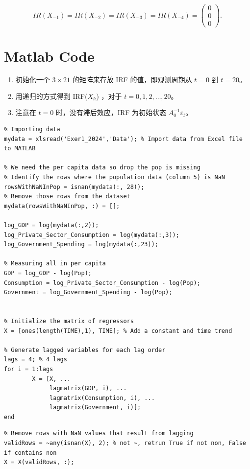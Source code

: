 \documentclass{article}
\begin{document}
\begin{CJK}{UTF8}{gbsn}
\begin{equation}
    IR(X_{-1}) = IR(X_{-2}) = IR(X_{-3}) = IR(X_{-4}) = \begin{pmatrix} 0 \\ 0 \\ 0 \end{pmatrix}.
\end{equation}

\section*{Matlab Code}
\begin{enumerate}
    \item 初始化一个 $3 \times 21$ 的矩阵来存放 IRF 的值，即观测周期从 $t = 0$ 到 $t = 20$。
    \item 用递归的方式得到 IRF($X_h$) ，对于 $t = 0, 1, 2, \ldots, 20$。
    \item 注意在 $t = 0$ 时，没有滞后效应，IRF 为初始状态 ${A_0^{-1} \varepsilon_t}$。
\end{enumerate}

\begin{lstlisting}
% Importing data
mydata = xlsread('Exer1_2024','Data'); % Import data from Excel file to MATLAB 

% We need the per capita data so drop the pop is missing 
% Identify the rows where the population data (column 5) is NaN
rowsWithNaNInPop = isnan(mydata(:, 28));
% Remove those rows from the dataset
mydata(rowsWithNaNInPop, :) = [];

log_GDP = log(mydata(:,2));
log_Private_Sector_Consumption = log(mydata(:,3));
log_Government_Spending = log(mydata(:,23));

% Measuring all in per capita
GDP = log_GDP - log(Pop);
Consumption = log_Private_Sector_Consumption - log(Pop);
Government = log_Government_Spending - log(Pop);

    
% Initialize the matrix of regressors
X = [ones(length(TIME),1), TIME]; % Add a constant and time trend
 
% Generate lagged variables for each lag order
lags = 4; % 4 lags
for i = 1:lags
        X = [X, ...
             lagmatrix(GDP, i), ...
             lagmatrix(Consumption, i), ...
             lagmatrix(Government, i)];
end

\end{lstlisting}

\begin{lstlisting}
% Remove rows with NaN values that result from lagging
validRows = ~any(isnan(X), 2); % not ~, retrun True if not non, False if contains non
X = X(validRows, :);
    

\end{lstlisting}
\end{CJK}
\end{document}
